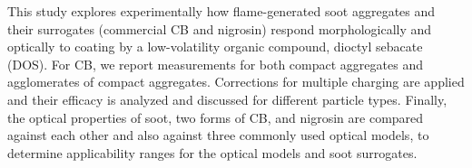This study explores experimentally how flame-generated soot aggregates and their surrogates (commercial CB and nigrosin) respond morphologically and optically to coating by a low-volatility organic compound, dioctyl sebacate (DOS). For CB, we report measurements for both compact aggregates and agglomerates of compact aggregates. Corrections for multiple charging are applied and their efficacy is analyzed and discussed for different particle types. Finally, the optical properties of soot, two forms of CB, and nigrosin are compared against each other and also against three commonly used optical models, to determine applicability ranges for the optical models and soot surrogates.
